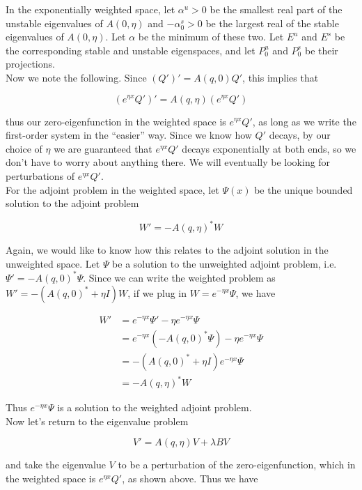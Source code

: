 \documentclass[12pt]{article}
\begin{document}
In the exponentially weighted space, let $\alpha^u > 0$ be the smallest real part of the unstable eigenvalues of $A(0, \eta)$ and $-\alpha^s_0 > 0$ be the largest real of the stable eigenvalues of $A(0, \eta)$. Let $\alpha$ be the minimum of these two. Let $E^u$ and $E^s$ be the corresponding stable and unstable eigenspaces, and let $P^u_0$ and $P^s_0$ be their projections.\\

Now we note the following. Since $(Q')' = A(q, 0)Q'$, this implies that

\[
(e^{\eta x}Q')' = A(q, \eta)(e^{\eta x}Q')
\]

thus our zero-eigenfunction in the weighted space is $e^{\eta x}Q'$, as long as we write the first-order system in the ``easier'' way. Since we know how $Q'$ decays, by our choice of $\eta$ we are guaranteed that $e^{\eta x}Q'$ decays exponentially at both ends, so we don't have to worry about anything there. We will eventually be looking for perturbations of $e^{\eta x}Q'$. \\

For the adjoint problem in the weighted space, let $\Psi(x)$ be the unique bounded solution to the adjoint problem 

\[
W' = -A(q, \eta)^* W
\]

Again, we would like to know how this relates to the adjoint solution in the unweighted space. Let $\Psi$ be a solution to the unweighted adjoint problem, i.e. $\Psi' = -A(q, 0)^* \Psi$. Since we can write the weighted problem as $W' = -( A(q, 0)^* + \eta I)W $, if we plug in $W = e^{-\eta x} \Psi$, we have

\begin{align*} 
W' &= e^{-\eta x} \Psi' - \eta e^{-\eta x} \Psi \\
&= e^{-\eta x}( -A(q, 0)^* \Psi ) - \eta e^{-\eta x} \Psi \\
&= -(A(q, 0)^* + \eta I) e^{-\eta x} \Psi \\
&= -A(q, \eta)^* W
\end{align*}

Thus $e^{-\eta x} \Psi$ is a solution to the weighted adjoint problem.\\

Now let's return to the eigenvalue problem

\[
V' = A(q, \eta)V + \lambda B V
\]

and take the eigenvalue $V$ to be a perturbation of the zero-eigenfunction, which in the weighted space is $e^{\eta x} Q'$, as shown above. Thus we have
\end{document}
